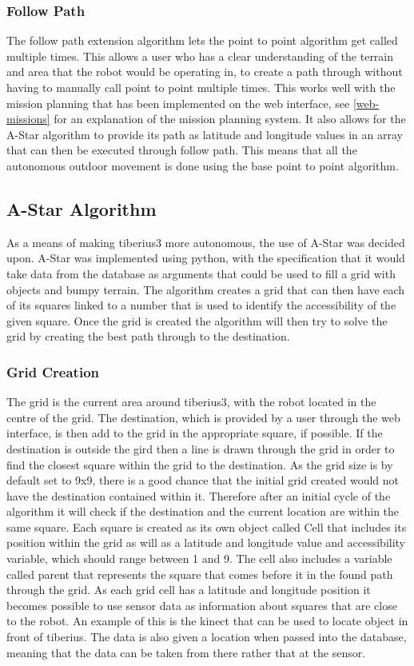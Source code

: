 \subsubsection{Follow Path}
The follow path extension algorithm lets the point to point algorithm get called multiple times. This allows a user who has a clear understanding of the terrain and area that the robot would be operating in, to create a path through without having to manually call point to point multiple times. This works well with the mission planning that has been implemented on the web interface, see \ref{web-missions} for an explanation of the mission planning system. It also allows for the A-Star algorithm to provide its path as latitude and longitude values in an array that can then be executed through follow path. This means that all the autonomous outdoor movement is done using the base point to point algorithm.
\subsection{A-Star Algorithm}
As a means of making \gls{tiberius3} more autonomous, the use of A-Star was decided upon. A-Star was implemented using python, with the specification that it would take data from the database as arguments that could be used to fill a grid with objects and bumpy terrain. The algorithm creates a grid that can then have each of its squares linked to a number that is used to identify the accessibility of the given square. Once the grid is created the algorithm will then try to solve the grid by creating the best path through to the destination.
\subsubsection{Grid Creation}
The grid is the current area around \gls{tiberius3}, with the robot located in the centre of the grid. The destination, which is provided by a user through the web interface, is then add to the grid in the appropriate square, if possible. If the destination is outside the gird then a line is drawn through the grid in order to find the closest square within the grid to the destination. As the grid size is by default set to 9x9, there is a good chance that the initial grid created would not have the destination contained within it. Therefore after an initial cycle of the algorithm it will check if the destination and the current location are within the same square.
\newline
Each square is created as its own object called Cell that includes its position within the grid as will as a latitude and longitude value and accessibility variable, which should range between 1 and 9. The cell also includes a variable called parent that represents the square that comes before it in the found path through the grid. As each grid cell has a latitude and longitude position it becomes possible to use sensor data as information about squares that are close to the robot. An example of this is the kinect that can be used to locate object in front of tiberius. The data is also given a location when passed into the database, meaning that the data can be taken from there rather that at the sensor.
